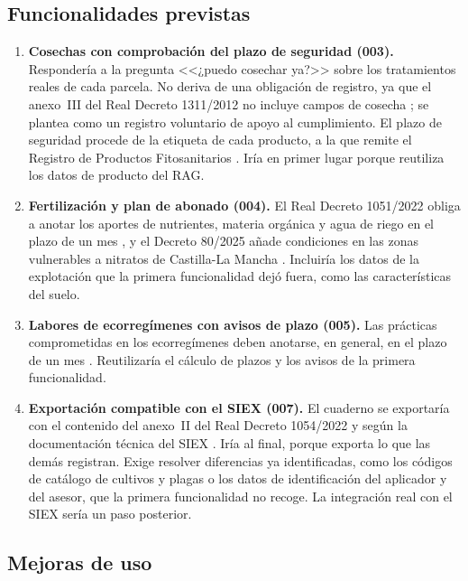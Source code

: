 \subsection{Funcionalidades previstas}\label{subsec:FuncionalidadesPrevistas}

\begin{enumerate}
	\item \textbf{Cosechas con comprobación del plazo de seguridad (003).} Respondería a la pregunta <<¿puedo cosechar ya?>> sobre los tratamientos reales de cada parcela. No deriva de una obligación de registro, ya que el anexo~III del Real Decreto 1311/2012 no incluye campos de cosecha \citep{rd1311-2012}; se plantea como un registro voluntario de apoyo al cumplimiento. El plazo de seguridad procede de la etiqueta de cada producto, a la que remite el Registro de Productos Fitosanitarios \citep{mapa-registro-fitosanitarios}. Iría en primer lugar porque reutiliza los datos de producto del RAG.
	\item \textbf{Fertilización y plan de abonado (004).} El Real Decreto 1051/2022 obliga a anotar los aportes de nutrientes, materia orgánica y agua de riego en el plazo de un mes \citep{rd1051-2022}, y el Decreto 80/2025 añade condiciones en las zonas vulnerables a nitratos de Castilla-La Mancha \citep{decreto80-2025clm}. Incluiría los datos de la explotación que la primera funcionalidad dejó fuera, como las características del suelo.
	\item \textbf{Labores de ecorregímenes con avisos de plazo (005).} Las prácticas comprometidas en los ecorregímenes deben anotarse, en general, en el plazo de un mes \citep{rd1048-2022}. Reutilizaría el cálculo de plazos y los avisos de la primera funcionalidad.
	\item \textbf{Exportación compatible con el SIEX (007).} El cuaderno se exportaría con el contenido del anexo~II del Real Decreto 1054/2022 \citep{rd1054-2022} y según la documentación técnica del SIEX \citep{fega-doc-tecnica-siex}. Iría al final, porque exporta lo que las demás registran. Exige resolver diferencias ya identificadas, como los códigos de catálogo de cultivos y plagas o los datos de identificación del aplicador y del asesor, que la primera funcionalidad no recoge. La integración real con el SIEX sería un paso posterior.
\end{enumerate}

\subsection{Mejoras de uso}\label{subsec:MejorasUso}

